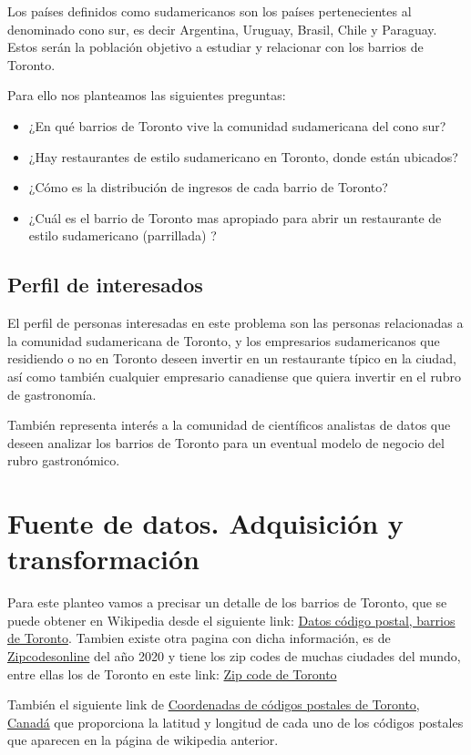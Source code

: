 \documentclass[10pt,a4paper,arial, spanish]{article}
\begin{document}
Los países definidos como sudamericanos son los países pertenecientes al denominado cono sur, es decir Argentina, Uruguay, Brasil, Chile y Paraguay. Estos serán la población objetivo  a estudiar y relacionar con los barrios de Toronto.  

Para ello nos planteamos las siguientes preguntas:
\begin{itemize}
	\item  ¿En qué barrios de Toronto vive la comunidad sudamericana del cono sur? 
	\item  ¿Hay restaurantes de estilo sudamericano en Toronto, donde están ubicados? 
	\item  ¿Cómo es la distribución de ingresos de cada barrio de Toronto?
	\item  ¿Cuál es el barrio de Toronto mas apropiado para abrir un restaurante de estilo sudamericano (parrillada) ?  
\end{itemize}
\subsection{Perfil de interesados}
El perfil de personas interesadas en este problema son las personas relacionadas a la comunidad sudamericana de Toronto, y los empresarios sudamericanos que residiendo o no en Toronto deseen invertir en un restaurante típico en la ciudad, así como también cualquier empresario canadiense que quiera invertir en el rubro de gastronomía.

También representa interés a  la comunidad de científicos analistas de datos que deseen analizar los barrios de Toronto para un eventual modelo de negocio del rubro gastronómico.

\section{Fuente de datos. Adquisición y transformación}\label{datos}
Para este planteo vamos a precisar un detalle de los barrios de Toronto, que se puede obtener en Wikipedia desde el siguiente link: {\href{https://en.wikipedia.org/wiki/List_of_postal_codes_of_Canada:_M}{Datos código postal, barrios de Toronto}}. Tambien existe otra pagina con dicha información, es de {\href{https://www.zipcodesonline.com/2020/}{Zipcodesonline}} del año 2020 y tiene los zip codes de muchas ciudades del mundo, entre ellas los de Toronto en este link: {\href{https://www.zipcodesonline.com/2020/06/postal-code-of-toronto-in-2020.html}{Zip code de Toronto}} 

También el siguiente link de {\href{https://cocl.us/Geospatial_data\%E2\%80\%9D}{Coordenadas de códigos postales de Toronto, Canadá}} que proporciona la latitud y longitud de cada uno de los códigos postales que aparecen en la página de wikipedia anterior.
\end{document}
